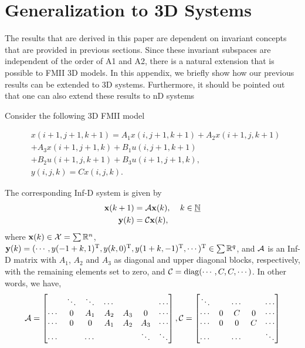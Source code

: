 \documentclass[journal,12pt,draftcls,onecolumn]{IEEEtran}
\newcommand{\tran}{\mathrm{T}}
\newcommand{\bbm}{\begin{bmatrix}}
\newcommand{\ebm}{\end{bmatrix}}
\newcommand{\bs}{\begin{small}}
\newcommand{\es}{\end{small}}
\newcommand{\diag}{\mathrm{diag}}
\begin{document}
\section{Generalization to 3D Systems}\label{Sec:3dFM}
The results that are derived in this paper are dependent on invariant concepts that are
provided in previous sections. Since these invariant subspaces are independent of the order
of A1 and A2, there is a natural extension that is possible to FMII 3D models. In this
appendix, we briefly show how our previous results can be extended to 3D systems.
Furthermore, it should be pointed out that one can also extend these results to nD systems


Consider the following 3D FMII model
\bs
\begin{equation}\label{Eq:FM3D}
\begin{split}
&x(i+1,j+1,k+1)= A_1x(i,j+1,k+1)+ A_2x(i+1,j,k+1)\\&+A_3x(i+1,j+1,k)+ B_1u(i,j+1,k+1)\\&+ B_2u(i+1,j,k+1)+B_3u(i+1,j+1,k),\\
&y(i,j,k) = Cx(i,j,k).
\end{split}
\end{equation}
\es
The corresponding Inf-D system is given by
\begin{equation}\label{Eq:IDRep3D}
\begin{split}
{\bf x}(k+1) &= \mathcal{A}{\bf x}(k),\;\;\;\; k\in\underline{\mathbb{N}} \\
{\bf y}(k) &=\mathcal{C}{\bf x}(k),
\end{split}
\end{equation} 
where ${\bf x}(k)\in\mathcal{X}=\sum{\mathbb{R}^n}$, ${\bf y}(k)=(\cdots,y(-1+k,1)^\tran,y(k,0)^\tran,y(1+k,-1)^\tran,\cdots)^\tran\in\sumbanach{\fld{R}^q}$, and $\mathcal{A}$ is an Inf-D matrix with $A_1$, $A_2$ and $A_3$ as diagonal and upper  diagonal blocks, respectively, with the remaining elements set to zero, and $\op{C} = \diag(\cdots,C,C,\cdots)$. In other words, we have,
\begin{equation}
\op{A} = \bbm \ &\ddots &\ddots &\cdots & & &\cdots\\
\cdots &0 &A_1 &A_2 &A_3 &0 &\cdots\\
\cdots &0 &0 &A_1 &A_2 &A_3 &\cdots\\
\cdots & &\cdots & & &\ddots &\ddots \ebm , 
\op{C} = \bbm \ddots & &\cdots & &\cdots\\
\cdots &0 &C &0 &\cdots\\
\cdots &0 &0 &C &\cdots \\
\cdots & &\cdots & &\ddots\ebm												
\end{equation}
\end{document}
